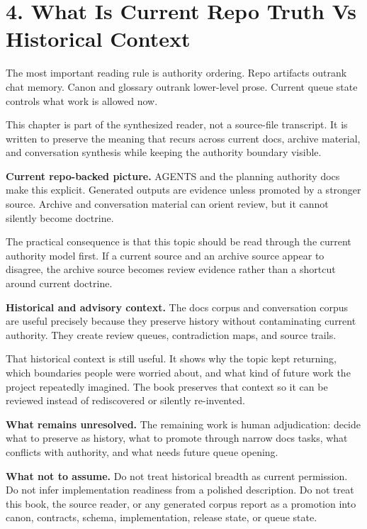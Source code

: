 \documentclass[10.5pt,a4paper,openany]{book}
\begin{document}
\section{4. What Is Current Repo Truth Vs Historical Context}

The most important reading rule is authority ordering.\allowbreak{} Repo artifacts outrank chat memory.\allowbreak{} Canon and glossary outrank lower-\allowbreak{}level prose.\allowbreak{} Current queue state controls what work is allowed now.\allowbreak{}


This chapter is part of the synthesized reader, not a source-\allowbreak{}file transcript.\allowbreak{} It is written to preserve the meaning that recurs across current docs, archive material, and conversation synthesis while keeping the authority boundary visible.\allowbreak{}


\textbf{Current repo-backed picture.} AGENTS and the planning authority docs make this explicit.\allowbreak{} Generated outputs are evidence unless promoted by a stronger source.\allowbreak{} Archive and conversation material can orient review, but it cannot silently become doctrine.\allowbreak{}


The practical consequence is that this topic should be read through the current authority model first.\allowbreak{} If a current source and an archive source appear to disagree, the archive source becomes review evidence rather than a shortcut around current doctrine.\allowbreak{}


\textbf{Historical and advisory context.} The docs corpus and conversation corpus are useful precisely because they preserve history without contaminating current authority.\allowbreak{} They create review queues, contradiction maps, and source trails.\allowbreak{}


That historical context is still useful.\allowbreak{} It shows why the topic kept returning, which boundaries people were worried about, and what kind of future work the project repeatedly imagined.\allowbreak{} The book preserves that context so it can be reviewed instead of rediscovered or silently re-\allowbreak{}invented.\allowbreak{}


\textbf{What remains unresolved.} The remaining work is human adjudication: decide what to preserve as history, what to promote through narrow docs tasks, what conflicts with authority, and what needs future queue opening.\allowbreak{}


\textbf{What not to assume.} Do not treat historical breadth as current permission.\allowbreak{} Do not infer implementation readiness from a polished description.\allowbreak{} Do not treat this book, the source reader, or any generated corpus report as a promotion into canon, contracts, schema, implementation, release state, or queue state.\allowbreak{}
\end{document}
